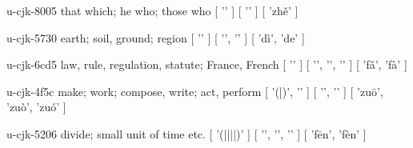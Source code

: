\begin{multicols}{2}
\cjkgGlue{} u-cjk-8005  that which; he who; those who  [ '\cjkgGlue{}' ]  [ '\cjkgGlue{}' ]  [ 'zh{\mktsRsgFb{}ě}' ] 

\cjkgGlue{} u-cjk-5730  earth; soil, ground; region  [ '\cjkgGlue{}' ]  [ '\cjkgGlue{}', '\cjkgGlue{}' ]  [ 'dì', 'de' ] 

\cjkgGlue{} u-cjk-6cd5  law, rule, regulation, statute; France, French  [ '\cjkgGlue{}' ]  [ '\cjkgGlue{}', '\cjkgGlue{}', '\cjkgGlue{}' ]  [ 'f{\mktsRsgFb{}ǎ}', 'fà' ] 

\cjkgGlue{} u-cjk-4f5c  make; work; compose, write; act, perform  [ '\cjkgGlue{}(\cjkgGlue{}|\cjkgGlue{})', '\cjkgGlue{}' ]  [ '\cjkgGlue{}', '\cjkgGlue{}' ]  [ 'zu{\mktsRsgFb{}ō}', 'zuò', 'zuó' ] 

\cjkgGlue{} u-cjk-5206  divide; small unit of time etc.  [ '\cjkgGlue{}(\cjkgGlue{}|\cjkgGlue{}|\cjkgGlue{}|\cjkgGlue{}|\cjkgGlue{})' ]  [ '\cjkgGlue{}', '\cjkgGlue{}', '\cjkgGlue{}' ]  [ 'f{\mktsRsgFb{}ē}n', 'fèn' ] 


\end{multicols}

